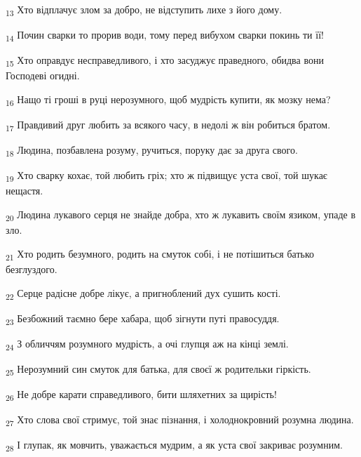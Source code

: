 \begin{tcolorbox}
\textsubscript{13} Хто відплачує злом за добро, не відступить лихе з його дому.
\end{tcolorbox}
\begin{tcolorbox}
\textsubscript{14} Почин сварки то прорив води, тому перед вибухом сварки покинь ти її!
\end{tcolorbox}
\begin{tcolorbox}
\textsubscript{15} Хто оправдує несправедливого, і хто засуджує праведного, обидва вони Господеві огидні.
\end{tcolorbox}
\begin{tcolorbox}
\textsubscript{16} Нащо ті гроші в руці нерозумного, щоб мудрість купити, як мозку нема?
\end{tcolorbox}
\begin{tcolorbox}
\textsubscript{17} Правдивий друг любить за всякого часу, в недолі ж він робиться братом.
\end{tcolorbox}
\begin{tcolorbox}
\textsubscript{18} Людина, позбавлена розуму, ручиться, поруку дає за друга свого.
\end{tcolorbox}
\begin{tcolorbox}
\textsubscript{19} Хто сварку кохає, той любить гріх; хто ж підвищує уста свої, той шукає нещастя.
\end{tcolorbox}
\begin{tcolorbox}
\textsubscript{20} Людина лукавого серця не знайде добра, хто ж лукавить своїм язиком, упаде в зло.
\end{tcolorbox}
\begin{tcolorbox}
\textsubscript{21} Хто родить безумного, родить на смуток собі, і не потішиться батько безглуздого.
\end{tcolorbox}
\begin{tcolorbox}
\textsubscript{22} Серце радісне добре лікує, а пригноблений дух сушить кості.
\end{tcolorbox}
\begin{tcolorbox}
\textsubscript{23} Безбожний таємно бере хабара, щоб зігнути путі правосуддя.
\end{tcolorbox}
\begin{tcolorbox}
\textsubscript{24} З обличчям розумного мудрість, а очі глупця аж на кінці землі.
\end{tcolorbox}
\begin{tcolorbox}
\textsubscript{25} Нерозумний син смуток для батька, для своєї ж родительки гіркість.
\end{tcolorbox}
\begin{tcolorbox}
\textsubscript{26} Не добре карати справедливого, бити шляхетних за щирість!
\end{tcolorbox}
\begin{tcolorbox}
\textsubscript{27} Хто слова свої стримує, той знає пізнання, і холоднокровний розумна людина.
\end{tcolorbox}
\begin{tcolorbox}
\textsubscript{28} І глупак, як мовчить, уважається мудрим, а як уста свої закриває розумним.
\end{tcolorbox}
